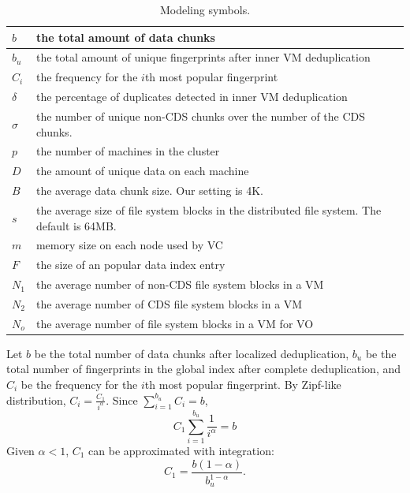 \begin{table}[ht]
\centering
\begin{tabular}{|p{1.25cm}|p{6.5cm}|}
\hline
$b$ &  the total amount of data chunks\\ 
\hline
$b_u$ &  the total amount of unique fingerprints after inner VM  deduplication\\
\hline
$C_i$ &  the frequency for the $i$th most popular fingerprint\\
\hline
$\delta$ &  the percentage of duplicates detected in inner VM deduplication\\
\hline
$\sigma$ &  the number of unique non-CDS chunks over  the number of the CDS chunks.\\
\hline
$p$ & the number of machines in the cluster\\
\hline
$D$ & the amount of unique data on each machine\\
\hline
$B$ & the average data chunk size. Our setting is  4K.\\
\hline
$s$ & the average size of file system blocks in the distributed file system. The default is  64MB.\\
\hline
$m$ & memory size on each node used by VC\\ 
\hline
$F$ & the size of an popular data index entry\\
$N_1$ & the average number  of non-CDS file system blocks  in a VM\\
$N_2$ & the average number  of CDS file system blocks  in a VM\\
$N_o$ & the average number  of file system blocks  in a VM for VO\\
\hline
\end{tabular}
\caption{Modeling  symbols.}
\label{tab:symbol}
\end{table}


Let $b$ be the total number of data chunks after localized deduplication, 
$b_u$ be the total number of fingerprints 
in the global index after complete deduplication, and
$C_i$ be the frequency for the $i$th most popular fingerprint. 
By Zipf-like distribution, $C_i = \frac{C_1}{i^\alpha}.$
Since $ \sum_{i=1}^{b_u}C_i = b$,
\[
C_1 \sum_{i=1}^{b_u}\frac{1}{i^\alpha} = b
\]
Given $\alpha <1$, $C_1$ can be approximated with integration:
\begin{equation}
C_1=\frac{b(1-\alpha)}{b_u^{1-\alpha}}.
\end{equation}


